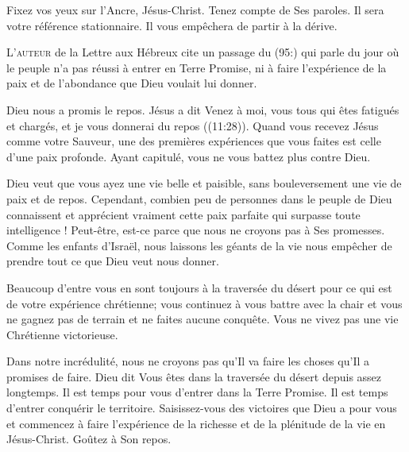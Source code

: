 Fixez vos yeux sur l'Ancre, Jésus-Christ. Tenez compte de Ses paroles.
 Il sera votre référence stationnaire.
 Il vous empêchera de partir à la dérive. 

\dvrule






\lettrine{L}{'auteur} de la Lettre aux Hébreux
 cite un passage du (95:) qui parle du jour où le peuple
 n'a pas réussi à entrer en Terre Promise, ni à faire l'expérience
 de la paix et de l'abondance que Dieu voulait lui donner. 

Dieu nous a promis le repos. Jésus a dit\frcolon {}
 \Og Venez à moi, vous tous qui êtes fatigués et chargés,
 et je vous donnerai du repos \Fg{} ((11:28)).
 Quand vous recevez Jésus comme votre Sauveur, une des premières expériences
 que vous faites est celle d'une paix profonde.
 Ayant capitulé, vous ne vous battez plus contre Dieu. 


Dieu veut que vous ayez une vie belle et paisible, sans bouleversement
 \ocadr une vie de paix et de repos.
 Cependant, combien peu de personnes dans le peuple de Dieu connaissent
 et apprécient vraiment cette paix parfaite qui surpasse toute intelligence !
 Peut-être,  est-ce parce que nous ne croyons pas
 à Ses promesses.
 Comme les enfants d'Israël, nous laissons les géants de la vie
 nous empêcher de prendre tout ce que Dieu veut nous donner. 

Beaucoup d'entre vous en sont toujours à la traversée du désert
 pour ce qui est de votre expérience chrétienne;
 vous continuez à vous battre avec la chair et vous ne gagnez pas de terrain
 et ne faites aucune conquête. Vous ne vivez pas
 une vie Chrétienne 
 victorieuse. 

Dans notre incrédulité, nous ne croyons pas qu'Il va faire les choses
 qu'Il a promises 
 de faire.
 Dieu dit\frcolon {}
 \Og Vous êtes dans la traversée du désert depuis assez longtemps.
 Il est temps pour vous d'entrer dans la Terre Promise.
 Il est temps d'entrer conquérir le territoire. \Fg{}
 Saisissez-vous 
 des victoires que Dieu a pour vous et commencez à faire l'expérience
 de la richesse et de la plénitude de la vie en Jésus-Christ.
 Goûtez à Son repos. 

